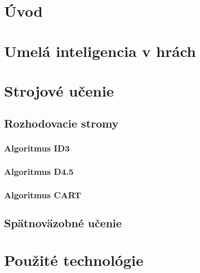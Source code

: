 \documentclass[slovak, master]{diploma}
\begin{document}
\MakeTitlePages

\listoffigures
\clearpage

\listoftables
\clearpage

\lstlistoflistings
\clearpage

\chapter{Úvod}
\label{sec:Introduction}


\chapter{Umelá inteligencia v hrách}
\label{sec:AI in games}

\chapter{Strojové učenie}
\label{sec:MachineLearningOverview}

\section{Rozhodovacie stromy}
\label{sec:DecisionTreesOverview}
\subsection{Algoritmus ID3}
\label{sec:ID3}
\subsection{Algoritmus D4.5}
\label{sec:D45}
\subsection{Algoritmus CART}
\label{sec:CART}

\section{Spätnoväzobné učenie}
\label{sec:ReinforcemenLearningOverview}


\chapter{Použité technológie}
\label{sec:Tech}
\end{document}
